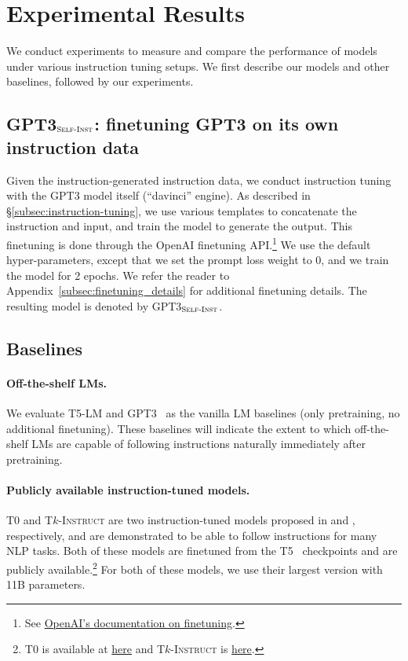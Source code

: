 \label{subsec:quality}

\section{Experimental Results}
\label{sec:experiment_results}

We conduct experiments to measure and compare the performance of models under various instruction tuning setups. We first describe our models and other baselines, followed by our experiments. 

\subsection{\textsc{GPT3}$_{\textsc{Self-Inst}}$: finetuning \textsc{GPT3} on its own instruction data}
\label{subsec:self-instruct-gpt3}
Given the instruction-generated instruction data, we conduct instruction tuning with the \textsc{GPT3} model itself (``davinci'' engine). As described in \S\ref{subsec:instruction-tuning}, we use various templates to concatenate the instruction and input, and train the model to generate the output. This finetuning is done through the OpenAI finetuning API.\footnote{See \href{https://beta.openai.com/docs/guides/fine-tuning}{OpenAI's documentation on finetuning}. } We use the default hyper-parameters, except that we set the prompt loss weight to 0, and we train the model for 2 epochs. We refer the reader to Appendix~\ref{subsec:finetuning_details} for additional finetuning details. The resulting model is denoted by \textsc{GPT3}$_{\textsc{Self-Inst}}$.

\subsection{Baselines}
\paragraph{Off-the-shelf LMs.} We evaluate T5-LM \cite{lester2021power,raffel2020exploring} and \textsc{GPT3}~\cite{brown2020gpt3} as the vanilla LM baselines (only pretraining, no additional finetuning). These baselines will indicate the extent to which off-the-shelf LMs are capable of following instructions naturally immediately after pretraining.

\paragraph{Publicly available instruction-tuned models.}
\textsc{T$0$} and \textsc{T$k$-Instruct} are two instruction-tuned models proposed in \citet{sanh2022multitask} and \citet{wang2022benchmarking}, respectively, and are demonstrated to be able to follow instructions for many NLP tasks. Both of these models are finetuned from the T5~\cite{raffel2020exploring} checkpoints and are publicly available.\footnote{
\textsc{T$0$} is available at \href{https://huggingface.co/bigscience/T0}{here} and \textsc{T$k$-Instruct} is  \href{https://huggingface.co/allenai/tk-instruct-11b-def}{here}.
} For both of these models, we use their largest version with 11B parameters.

